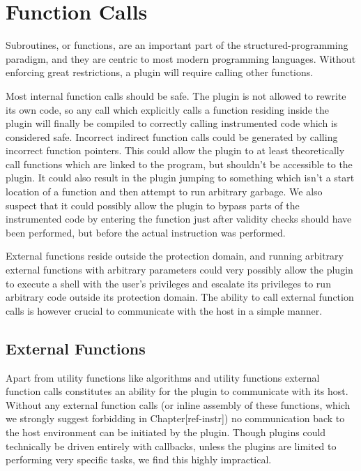 \chapter {Function Calls}

Subroutines, or functions, are an important part of the structured-programming
paradigm, and they are centric to most modern programming languages. Without
enforcing great restrictions, a plugin will require calling other functions.

Most internal function calls should be safe. The plugin is not allowed to
rewrite its own code, so any call which explicitly calls a function residing
inside the plugin will finally be compiled to correctly calling instrumented
code which is considered safe. Incorrect indirect function calls could be
generated by calling incorrect function pointers. This could allow the plugin to
at least theoretically call functions which are linked to the program, but
shouldn't be accessible to the plugin. It could also result in the plugin
jumping to something which isn't a start location of a function and then attempt
to run arbitrary garbage. We also suspect that it could possibly allow the
plugin to bypass parts of the instrumented code by entering the function just
after validity checks should have been performed, but before the actual
instruction was performed.

External functions reside outside the protection domain, and running arbitrary
external functions with arbitrary parameters could very possibly allow the
plugin to execute a shell with the user's privileges and escalate its privileges
to run arbitrary code outside its protection domain. The ability to call
external function calls is however crucial to communicate with the host in a
simple manner.


\section {External Functions}

Apart from utility functions like algorithms and utility functions external
function calls constitutes an ability for the plugin to communicate with its
host. Without any external function calls (or inline assembly of these
functions, which we strongly suggest forbidding in Chapter[ref-instr]) no
communication back to the host environment can be initiated by the plugin.
Though plugins could technically be driven entirely with callbacks, unless the
plugins are limited to performing very specific tasks, we find this highly
impractical.

